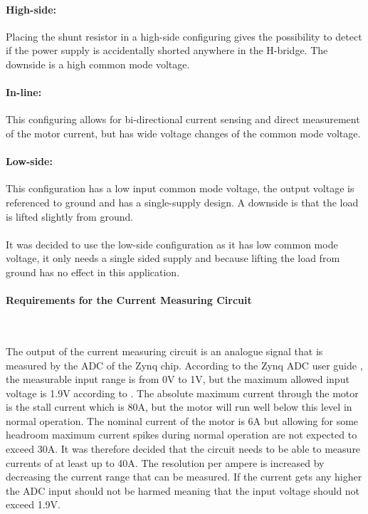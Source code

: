 \paragraph{High-side:} 
Placing the shunt resistor in a high-side configuring gives the possibility to detect if the power supply is accidentally shorted anywhere in the H-bridge. 
The downside is a high common mode voltage.

\paragraph{In-line:} 
This configuring allows for bi-directional current sensing and direct measurement of the motor current, but has wide voltage changes of the common mode voltage.

\paragraph{Low-side:} 
This configuration has a low input common mode voltage, the output voltage is referenced to ground and has a single-supply design.
A downside is that the load is lifted slightly from ground.
\\~\\
It was decided to use the low-side configuration as it has low common mode voltage, it only needs a single sided supply and because lifting the load from ground has no effect in this application.

\paragraph{Requirements for the Current Measuring Circuit} ~\\%
\label{par:requirements_for_the_current_measuring_circuit}

The output of the current measuring circuit is an analogue signal that is measured by the ADC of the Zynq chip.
According to the Zynq ADC user guide \cite{zynq_adc}, the measurable input range is from 0V to 1V, but the maximum allowed input voltage is 1.9V according to \cite{adc_zynq_webanswer}.
The absolute maximum current through the motor is the stall current which is 80A, but the motor will run well below this level in normal operation.
The nominal current of the motor is 6A but allowing for some headroom maximum current spikes during normal operation are not expected to exceed 30A. 
It was therefore decided that the circuit  needs to be able to measure currents of at least up to 40A.
The resolution per ampere is increased by decreasing the current range that can be measured.
If the current gets any higher the ADC input should not be harmed meaning that the input voltage should not exceed 1.9V.

